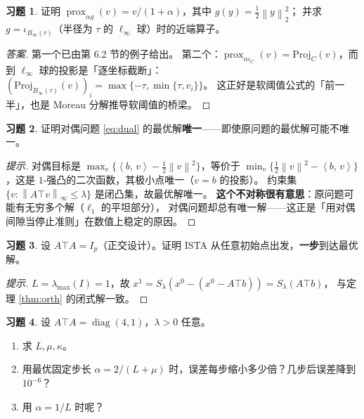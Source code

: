 \documentclass[11pt,a4paper,UTF8]{ctexart}
\theoremstyle{plain}
\theoremstyle{definition}
\newtheorem{exercise}{习题}[section]
\theoremstyle{remark}
\newcommand{\norm}[1]{\left\lVert #1 \right\rVert}
\newcommand{\inner}[2]{\left\langle #1,\, #2 \right\rangle}
\newcommand{\prox}{\operatorname{prox}}
\newcommand{\diag}{\operatorname{diag}}
\begin{document}
\begin{exercise}
证明 $\prox_{\alpha g}(v)=v/(1+\alpha)$，其中 $g(y)=\tfrac12\norm y_2^2$；
并求 $g=\iota_{B_\infty(\tau)}$（半径为 $\tau$ 的 $\ell_\infty$ 球）时的近端算子。
\end{exercise}

\begin{proof}[答案]
第一个已由第 6.2 节的例子给出。
第二个：$\prox_{\alpha\iota_C}(v)=\mathrm{Proj}_C(v)$，而到 $\ell_\infty$ 球的投影是「逐坐标截断」：
$(\mathrm{Proj}_{B_\infty(\tau)}(v))_i=\max\{-\tau,\min\{\tau,v_i\}\}$。
这正好是软阈值公式的「前一半」，也是 Moreau 分解推导软阈值的桥梁。
\end{proof}

\begin{exercise}
证明对偶问题 \eqref{eq:dual} 的最优解\textbf{唯一}——即使原问题的最优解可能不唯一。
\end{exercise}

\begin{proof}[提示]
对偶目标是 $\max_v\{\inner bv-\frac12\norm v^2\}$，等价于
$\min_v\{\frac12\norm v^2-\inner bv\}$，这是 $1$-强凸的二次函数，其极小点唯一（$v=b$ 的投影）。
约束集 $\{v:\norm{A\top v}_\infty\le\lambda\}$ 是闭凸集，故最优解唯一。
\textbf{这个不对称很有意思}：原问题可能有无穷多个解（$\ell_1$ 的平坦部分），
对偶问题却总有唯一解——这正是「用对偶间隙当停止准则」在数值上稳定的原因。
\end{proof}

\begin{exercise}
设 $A\top A=I_p$（正交设计）。证明 ISTA 从任意初始点出发，\textbf{一步}到达最优解。
\end{exercise}

\begin{proof}[提示]
$L=\lambda_{\max}(I)=1$，故 $x^{1}=S_{\lambda}(x^0-(x^0-A\top b))=S_\lambda(A\top b)$，
与定理 \ref{thm:orth} 的闭式解一致。
\end{proof}

\begin{exercise}\label{exe:kappa}
设 $A\top A=\diag(4,1)$，$\lambda>0$ 任意。
\begin{enumerate}
\item[(a)] 求 $L,\mu,\kappa$。
\item[(b)] 用最优固定步长 $\alpha=2/(L+\mu)$ 时，误差每步缩小多少倍？几步后误差降到 $10^{-6}$？
\item[(c)] 用 $\alpha=1/L$ 时呢？
\end{enumerate}
\end{exercise}
\end{document}
